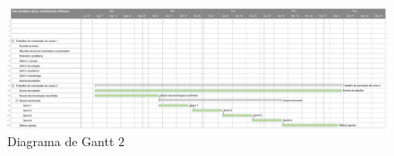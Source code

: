 \begin{landscape}

\begin{figure}[!h]                                                           
\centering                                                                   
\includegraphics [keepaspectratio=true,scale=0.5]{figuras/diagramaGantt2.eps} 
\caption{Diagrama de Gantt 2}                                   
\label{diagramaGantt2}                                                                                                                  
\end{figure}                                                                 

\end{landscape}


